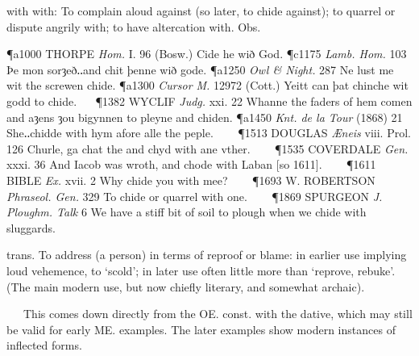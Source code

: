 \begin{description}[wide, labelwidth=!, labelindent=0pt]
\begin{myenumerate}
 with with: To complain aloud against (so later, to chide against); to quarrel or dispute angrily with; to have altercation with. Obs.

\P a1000 THORPE  \textit{Hom.} I. 96 (Bosw.) Cide he wið God.
\P c1175 \textit{Lamb.  Hom.} 103 Þe mon sorȝeð‥and chit þenne wið gode.
\P a1250 \textit{Owl  \& Night.} 287 Ne lust me wit the screwen chide.
\P a1300  \textit{Cursor M.} 12972 (Cott.) Yeitt can þat chinche wit godd to chide.   
\P 1382 WYCLIF  \textit{Judg.} xxi. 22 Whanne the faders of hem comen and aȝens ȝou bigynnen to pleyne and chiden.
\P a1450  \textit{Knt. de la Tour} (1868) 21 She‥chidde with hym afore alle the peple.    
\P 1513 DOUGLAS  \textit{Æneis} viii. Prol. 126 Churle, ga chat the and chyd with ane vther.    
\P 1535 COVERDALE  \textit{Gen.} xxxi. 36 And Iacob was wroth, and chode with Laban [so 1611].    
\P 1611 BIBLE  \textit{Ex.} xvii. 2 Why chide you with mee?    
\P 1693 W. ROBERTSON  \textit{Phraseol. Gen.} 329 To chide or quarrel with one.    
\P 1869 SPURGEON  \textit{J. Ploughm. Talk} 6 We have a stiff bit of soil to plough when we chide with sluggards.

 trans. To address (a person) in terms of reproof or blame: in earlier use implying loud vehemence, to ‘scold’; in later use often little more than ‘reprove, rebuke’. (The main modern use, but now chiefly literary, and somewhat archaic).

   This comes down directly from the OE. const. with the dative, which may still be valid for early ME. examples. The later examples show modern instances of inflected forms.


\end{myenumerate}
\end{description}
